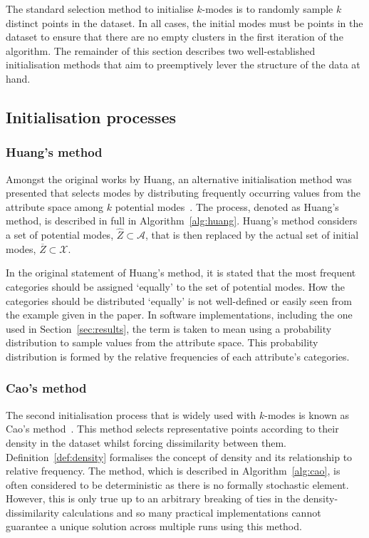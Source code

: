 

The standard selection method to initialise \(k\)-modes is to randomly sample
\(k\) distinct points in the dataset. In all cases, the initial modes must be
points in the dataset to ensure that there are no empty clusters in the first
iteration of the algorithm. The remainder of this section describes two
well-established initialisation methods that aim to preemptively lever the
structure of the data at hand.


\subsection{Initialisation processes}\label{subsec:inits}

\subsubsection{Huang's method}\label{subsec:huang}

Amongst the original works by Huang, an alternative initialisation method was
presented that selects modes by distributing frequently occurring values from the
attribute space among \(k\) potential modes~\cite{Huang1998}. The process,
denoted as Huang's method, is described in full in Algorithm~\ref{alg:huang}.
Huang's method considers a set of potential modes,
\(\widehat Z \subset \mathcal A\), that is then replaced by the actual set of
initial modes, \(\overline Z \subset \mathcal X\).

In the original statement of Huang's method, it is stated that the most
frequent categories should be assigned `equally' to the set of potential modes.
How the categories should be distributed `equally' is not well-defined or easily
seen from the example given in the paper. In software implementations, including
the one used in Section~\ref{sec:results}, the term is taken to mean using a
probability distribution to sample values from the attribute space. This
probability distribution is formed by the relative frequencies of each
attribute's categories.


%


\subsubsection{Cao's method}\label{subsec:cao}

The second initialisation process that is widely used with \(k\)-modes is known
as Cao's method~\cite{Cao2009}. This method selects representative points
according to their density in the dataset whilst forcing dissimilarity between
them. Definition~\ref{def:density} formalises the concept of density and its
relationship to relative frequency. The method, which is described in
Algorithm~\ref{alg:cao}, is often considered to be deterministic as there is no
formally stochastic element. However, this is only true up to an arbitrary
breaking of ties in the density-dissimilarity calculations and so many practical
implementations cannot guarantee a unique solution across multiple runs using
this method.

